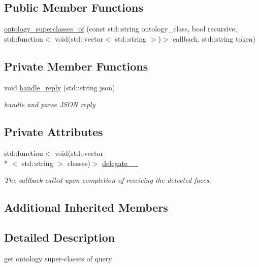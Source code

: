 \subsection*{Public Member Functions}
\begin{DoxyCompactItemize}
\item 
\hyperlink{classrapp_1_1cloud_1_1ontology__superclasses__of_a5ea014e66c47b185c28a05ccd24254d4}{ontology\-\_\-superclasses\-\_\-of} (const std\-::string ontology\-\_\-class, bool recursive, std\-::function$<$ void(std\-::vector$<$ std\-::string $>$)$>$ callback, std\-::string token)
\end{DoxyCompactItemize}
\subsection*{Private Member Functions}
\begin{DoxyCompactItemize}
\item 
void \hyperlink{classrapp_1_1cloud_1_1ontology__superclasses__of_a2f7e716668e287e965357498958fb446}{handle\-\_\-reply} (std\-::string json)
\begin{DoxyCompactList}\small\item\em handle and parse J\-S\-O\-N reply \end{DoxyCompactList}\end{DoxyCompactItemize}
\subsection*{Private Attributes}
\begin{DoxyCompactItemize}
\item 
std\-::function$<$ void(std\-::vector\\*
$<$ std\-::string $>$ classes)$>$ \hyperlink{classrapp_1_1cloud_1_1ontology__superclasses__of_a884f5a0c97c6cc6e0fe695168ae07a9a}{delegate\-\_\-\-\_\-}
\begin{DoxyCompactList}\small\item\em The callback called upon completion of receiving the detected faces. \end{DoxyCompactList}\end{DoxyCompactItemize}
\subsection*{Additional Inherited Members}


\subsection{Detailed Description}
get ontology super-\/classes of query 

